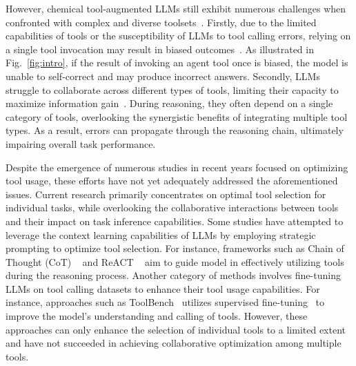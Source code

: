 However, chemical tool-augmented LLMs still exhibit numerous challenges when confronted with complex and diverse toolsets~\cite{bran2023chemcrowaugmentinglargelanguagemodels}.
Firstly, due to the limited capabilities of tools or the susceptibility of LLMs to tool calling errors, relying on a single tool invocation may result in biased outcomes~\cite{ye2024toolswordunveilingsafetyissues}. As illustrated in Fig.~\ref{fig:intro}, if the result of invoking an agent tool once is biased, the model is unable to self-correct and may produce incorrect answers.
Secondly, LLMs struggle to collaborate across different types of tools, limiting their capacity to maximize information gain~\cite{cheng2025toolunlearningtoolaugmentedllms}. During reasoning, they often depend on a single category of tools, overlooking the synergistic benefits of integrating multiple tool types. As a result, errors can propagate through the reasoning chain, ultimately impairing overall task performance.

Despite the emergence of numerous studies in recent years focused on optimizing tool usage, these efforts have not yet adequately addressed the aforementioned issues. Current research primarily concentrates on optimal tool selection for individual tasks, while overlooking the collaborative interactions between tools and their impact on task inference capabilities.
Some studies have attempted to leverage the context learning capabilities of LLMs by employing strategic prompting to optimize tool selection. For instance, frameworks such as Chain of Thought (CoT) ~\cite{wei2023chainofthoughtpromptingelicitsreasoning} and ReACT ~\cite{yao2023reactsynergizingreasoningacting,yang2023autogptonlinedecisionmaking} aim to guide model in effectively utilizing tools during the reasoning process. 
Another category of methods involves fine-tuning LLMs on tool calling datasets to enhance their tool usage capabilities. For instance, approaches such as ToolBench~\cite{qin2023toolllmfacilitatinglargelanguage} utilizes supervised fine-tuning~\cite{shen2024rethinkingdataselectionsupervised} to improve the model's understanding and calling of tools. 
However, these approaches can only enhance the selection of individual tools to a limited extent and have not succeeded in achieving collaborative optimization among multiple tools.

